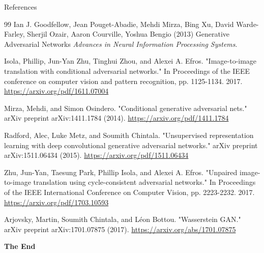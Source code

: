 \documentclass[aspectratio=169,xcolor=dvipsnames,svgnames,x11names,fleqn]{beamer}
\begin{document}
\begin{frame}{References}
    \scriptsize{
        \begin{thebibliography}{99}
             Ian J. Goodfellow, Jean Pouget-Abadie, Mehdi Mirza, Bing Xu, David Warde-Farley, Sherjil Ozair, Aaron Courville, Yoshua Bengio (2013)
            \newblock Generative Adversarial Networks
            \newblock \emph{Advances in Neural Information Processing Systems}.
            
             Isola, Phillip, Jun-Yan Zhu, Tinghui Zhou, and Alexei A. Efros. "Image-to-image translation with conditional adversarial networks." In Proceedings of the IEEE conference on computer vision and pattern recognition, pp. 1125-1134. 2017. \url{https://arxiv.org/pdf/1611.07004}
            
             Mirza, Mehdi, and Simon Osindero. "Conditional generative adversarial nets." arXiv preprint arXiv:1411.1784 (2014). \url{https://arxiv.org/pdf/1411.1784}
            
             Radford, Alec, Luke Metz, and Soumith Chintala. "Unsupervised representation learning with deep convolutional generative adversarial networks." arXiv preprint arXiv:1511.06434 (2015). \url{https://arxiv.org/pdf/1511.06434}
            
             Zhu, Jun-Yan, Taesung Park, Phillip Isola, and Alexei A. Efros. "Unpaired image-to-image translation using cycle-consistent adversarial networks." In Proceedings of the IEEE International Conference on Computer Vision, pp. 2223-2232. 2017. \url{https://arxiv.org/pdf/1703.10593}
            
             Arjovsky, Martin, Soumith Chintala, and Léon Bottou. "Wasserstein GAN." arXiv preprint arXiv:1701.07875 (2017).    \url{https://arxiv.org/abs/1701.07875}
            
            
            
            
            
        \end{thebibliography}
    }
\end{frame}




    \begin{frame}
        \Huge{\centerline{\color{MediumBlue}\textbf{The End}}}
    \end{frame}
\end{document}
